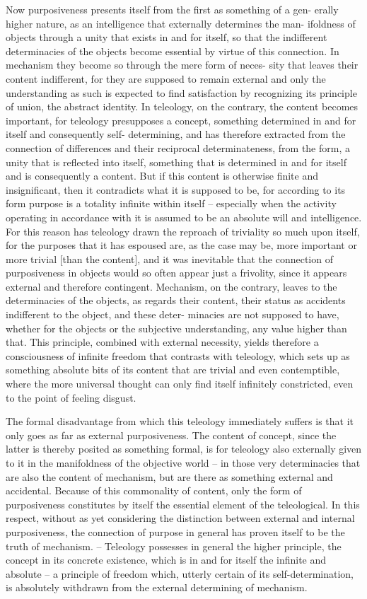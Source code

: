 Now purposiveness presents itself from the first as something of a gen-
erally higher nature, as an intelligence that externally determines the man-
ifoldness of objects through a unity that exists in and for itself, so that the
indifferent determinacies of the objects become essential by virtue of this
connection. In mechanism they become so through the mere form of neces-
sity that leaves their content indifferent, for they are supposed to remain
external and only the understanding as such is expected to find satisfaction
by recognizing its principle of union, the abstract identity. In teleology,
on the contrary, the content becomes important, for teleology presupposes
a concept, something determined in and for itself and consequently self-
determining, and has therefore extracted from the connection of differences
and their reciprocal determinateness, from the form, a unity that is reflected
into itself, something that is determined in and for itself and is consequently
a content. But if this content is otherwise finite and insignificant, then it
contradicts what it is supposed to be, for according to its form purpose is
a totality infinite within itself – especially when the activity operating in
accordance with it is assumed to be an absolute will and intelligence. For
this reason has teleology drawn the reproach of triviality so much upon
itself, for the purposes that it has espoused are, as the case may be, more
important or more trivial [than the content], and it was inevitable that
the connection of purposiveness in objects would so often appear just a
frivolity, since it appears external and therefore contingent. Mechanism,
on the contrary, leaves to the determinacies of the objects, as regards their
content, their status as accidents indifferent to the object, and these deter-
minacies are not supposed to have, whether for the objects or the subjective
understanding, any value higher than that. This principle, combined with
external necessity, yields therefore a consciousness of infinite freedom that
contrasts with teleology, which sets up as something absolute bits of its
content that are trivial and even contemptible, where the more universal
thought can only find itself infinitely constricted, even to the point of
feeling disgust.

The formal disadvantage from which this teleology immediately suffers
is that it only goes as far as external purposiveness. The content of concept,
since the latter is thereby posited as something formal, is for teleology also
externally given to it in the manifoldness of the objective world – in those
very determinacies that are also the content of mechanism, but are there as
something external and accidental. Because of this commonality of content,
only the form of purposiveness constitutes by itself the essential element of
the teleological. In this respect, without as yet considering the distinction
between external and internal purposiveness, the connection of purpose in
general has proven itself to be the truth of mechanism. – Teleology possesses
in general the higher principle, the concept in its concrete existence, which
is in and for itself the infinite and absolute – a principle of freedom which,
utterly certain of its self-determination, is absolutely withdrawn from the
external determining of mechanism.

